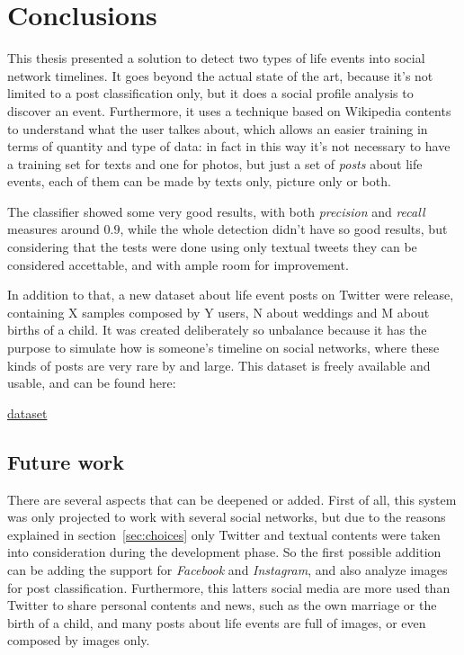 \chapter{Conclusions}
\label{cha:conclusions}
This thesis presented a solution to detect two types of life events into social network timelines. It goes beyond the actual state of the art, because it's not limited to a post classification only, but it does a social profile analysis to discover an event. Furthermore, it uses a technique based on Wikipedia contents to understand what the user talkes about, which allows an easier training in terms of quantity and type of data: in fact in this way it's not necessary to have a training set for texts and one for photos, but just a set of \emph{posts} about life events, each of them can be made by texts only, picture only or both.

The classifier showed some very good results, with both \emph{precision} and \emph{recall} measures around $0.9$, while the whole detection didn't have so good results, but considering that the tests were done using only textual tweets they can be considered accettable, and with ample room for improvement.

In addition to that, a new dataset about life event posts on Twitter were release, containing X samples composed by Y users, N about weddings and M about births of a child. It was created deliberately so unbalance because it has the purpose to simulate how is someone's timeline on social networks, where these kinds of posts are very rare by and large. This dataset is freely available and usable, and can be found here:
\begin{center}
\url{dataset}
\end{center}

\section{Future work}
\label{sec:futurework}
There are several aspects that can be deepened or added. First of all, this system was only projected to work with several social networks, but due to the reasons explained in section~\ref{sec:choices} only Twitter and textual contents were taken into consideration during the development phase. So the first possible addition can be adding the support for \emph{Facebook} and \emph{Instagram}, and also analyze images for post classification. Furthermore, this latters social media are more used than Twitter to share personal contents and news, such as the own marriage or the birth of a child, and many posts about life events are full of images, or even composed by images only.

